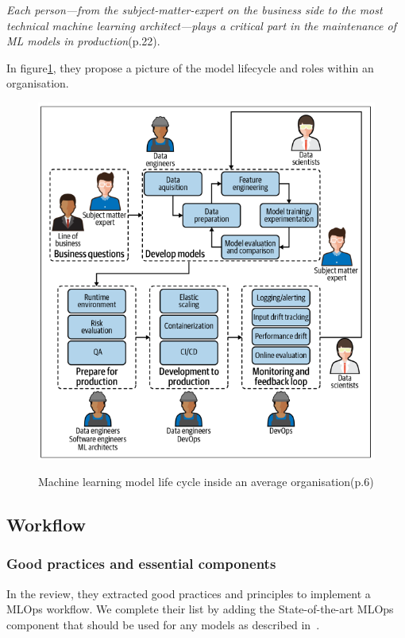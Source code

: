 \textit{Each person—from the subject-matter-expert on the business side to the most
technical machine learning architect—plays a critical part in the maintenance of ML
models in production}\cite{treveil2020introducing}(p.22).

In figure\ref{fig:mlop-people}, they propose a picture of the model lifecycle and roles within an organisation.
\begin{figure}[!htbp]
    \caption{Machine learning model life cycle inside an average
    organisation\cite{treveil2020introducing}(p.6)}
    \centering
    \includegraphics[scale=0.4]{images/mlops-people}
    \label{fig:mlop-people}
\end{figure}

\subsection{Workflow}\label{subsec:workflow}

\subsubsection{Good practices and essential components}

In the review\cite{Kreuzberger2022MachineLO}, they extracted good practices and principles to implement a MLOps workflow.
We complete their list by adding the State-of-the-art MLOps component that should be used for any models as described in~\cite{BURGUENOROMERO2025107499}.

